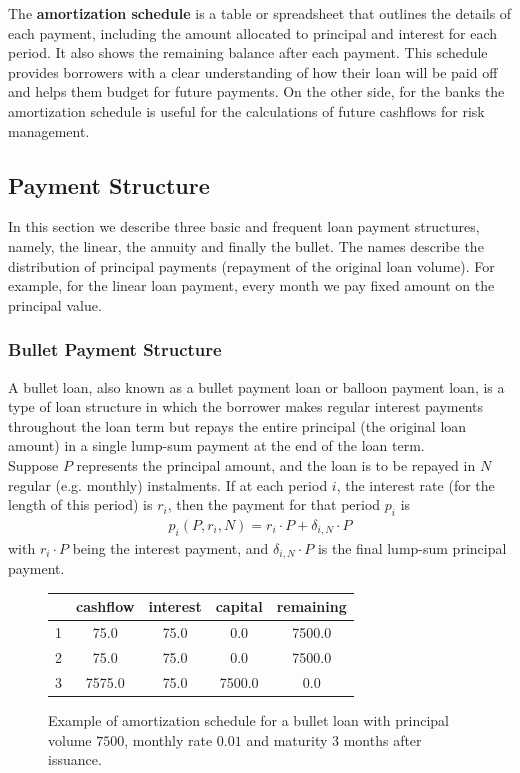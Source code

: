 \documentclass[11pt]{report}
\begin{document}
The \textbf{amortization schedule} is a table or spreadsheet that outlines the details of each payment, including the amount allocated to principal and interest for each period. It also shows the remaining balance after each payment. This schedule provides borrowers with a clear understanding of how their loan will be paid off and helps them budget for future payments. On the other side, for the banks the amortization schedule is useful for the calculations of future cashflows for risk management.

\subsection{Payment Structure}

In this section we describe three basic and frequent loan payment structures, namely, the linear, the annuity and finally the bullet. The names describe the distribution of principal payments (repayment of the original loan volume). For example, for the linear loan payment, every month we pay fixed amount on the principal value. 


\subsubsection{Bullet Payment Structure}

A bullet loan, also known as a bullet payment loan or balloon payment loan, is a type of loan structure in which the borrower makes regular interest payments throughout the loan term but repays the entire principal (the original loan amount) in a single lump-sum payment at the end of the loan term.\\

Suppose $P$ represents the principal amount, and the loan is to be repayed in $N$ regular (e.g. monthly) instalments. If at each period $i$, the interest rate (for the length of this period) is $r_i$, then the payment for that period $p_i$ is 
\begin{align}
	p_i(P,r_i,N) =r_i\cdot P+\delta_{i,N}\cdot P
	\label{bullet}
\end{align}
with $r_i\cdot P$ being the interest payment, and $\delta_{i,N}\cdot P$ is the final lump-sum principal payment.
\begin{figure}[ht!]
	\centering
	\begin{tabular}{|c|c|c|c|c|}
		\hline
		& cashflow & interest & capital & remaining\\
		\hline
		1 & 75.0 & 75.0 & 0.0 & 7500.0\\
		\hline
		2 & 75.0 & 75.0 & 0.0 & 7500.0\\
		\hline
		3 & 7575.0 & 75.0 & 7500.0 & 0.0\\
		\hline
	\end{tabular}
	\caption{Example of amortization schedule for a bullet loan with principal volume $7500$, monthly rate $0.01$ and maturity 3 months after issuance.}
\end{figure}
\end{document}
